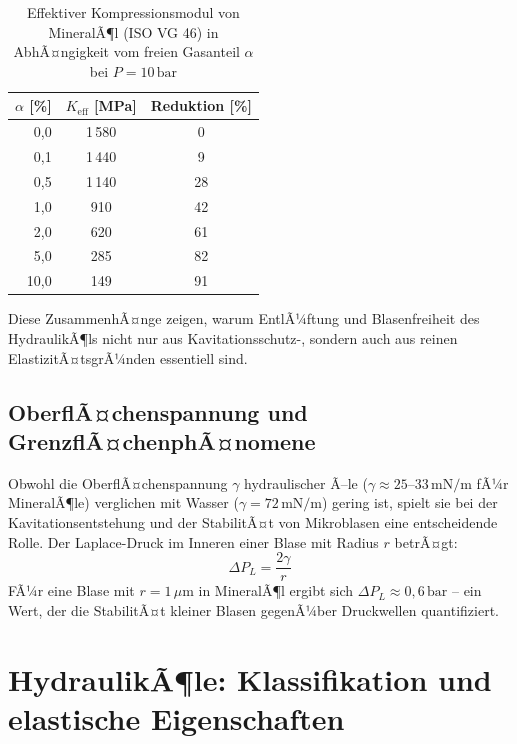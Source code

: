 ﻿\documentclass[a4paper,12pt]{scrreprt}
\theoremstyle{definition}
\begin{document}
\begin{table}[H]
  \centering
  \caption{Effektiver Kompressionsmodul von MineralÃ¶l (ISO VG 46) in
    AbhÃ¤ngigkeit vom freien Gasanteil $\alpha$ bei $P = 10\,\mathrm{bar}$}
  \label{tab:k_eff_gas}
  \begin{tabular}{rcc}
    \toprule
    $\alpha$ [\%] & $K_{\mathrm{eff}}$ [MPa] & Reduktion [\%] \\
    \midrule
    0{,}0    & 1\,580 &   0 \\
    0{,}1    & 1\,440 &   9 \\
    0{,}5    & 1\,140 &  28 \\
    1{,}0    &   910  &  42 \\
    2{,}0    &   620  &  61 \\
    5{,}0    &   285  &  82 \\
    10{,}0   &   149  &  91 \\
    \bottomrule
  \end{tabular}
\end{table}

Diese ZusammenhÃ¤nge zeigen, warum EntlÃ¼ftung und Blasenfreiheit des
HydraulikÃ¶ls nicht nur aus Kavitationsschutz-, sondern auch aus reinen
ElastizitÃ¤tsgrÃ¼nden essentiell sind.

\subsection{OberflÃ¤chenspannung und GrenzflÃ¤chenphÃ¤nomene}

Obwohl die OberflÃ¤chenspannung $\gamma$ hydraulischer Ã–le
($\gamma \approx 25$--$33\,\mathrm{mN/m}$ fÃ¼r MineralÃ¶le) verglichen mit
Wasser ($\gamma = 72\,\mathrm{mN/m}$) gering ist, spielt sie bei der
Kavitationsentstehung und der StabilitÃ¤t von Mikroblasen eine entscheidende
Rolle. Der Laplace-Druck im Inneren einer Blase mit Radius $r$ betrÃ¤gt:
\begin{equation}
  \Delta P_L = \frac{2\gamma}{r}
  \label{eq:laplace}
\end{equation}
FÃ¼r eine Blase mit $r = 1\,\mu\mathrm{m}$ in MineralÃ¶l ergibt sich
$\Delta P_L \approx 0{,}6\,\mathrm{bar}$ -- ein Wert, der die StabilitÃ¤t
kleiner Blasen gegenÃ¼ber Druckwellen quantifiziert.

\section{HydraulikÃ¶le: Klassifikation und elastische Eigenschaften}
\end{document}
